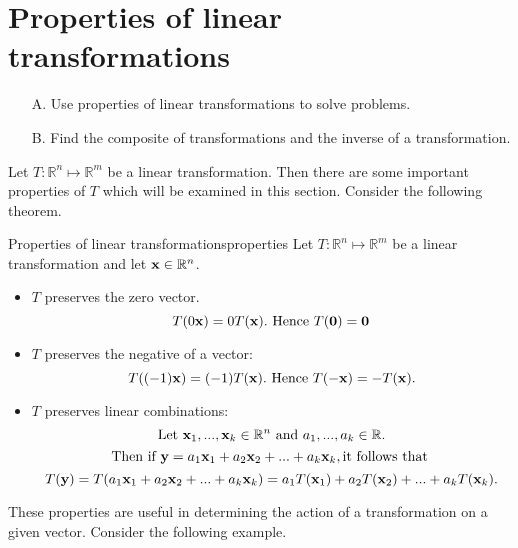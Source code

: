 \section{Properties of linear transformations}

\begin{outcome}
\begin{enumerate}
\item[A.] Use properties of linear transformations to solve problems. 

\item[B.] Find the composite of transformations and the inverse of a transformation.
\end{enumerate}
\end{outcome}

Let $T: \mathbb{R}^n \mapsto \mathbb{R}^m$ be a linear transformation. Then there are some important properties of $T$ which will be examined in this section. 
Consider the following theorem.

\begin{theorem}{Properties of linear transformations}{properties}
Let $T: \mathbb{R}^n \mapsto \mathbb{R}^m$ be a linear transformation and let ${\bf x} \in \mathbb{R}^n$. 

\begin{itemize}
\item $T$ preserves the zero vector. 
\[
T(0{\bf x}) = 0 T({\bf x}). \mbox{ Hence }T({\bf 0}) = {\bf 0}
\]
\item $T$ preserves the negative of a vector:
\[
T( (-1){\bf x})=(-1)T({\bf x}). \mbox{ Hence }T(-{\bf x}) = -T({\bf x}).
\]
\item $T$ preserves linear combinations:
\[
\mbox{Let }{\bf x}_1, ..., {\bf x}_k \in \mathbb{R}^n \mbox{ and }a_1, ..., a_k \in \mathbb{R}.
\]
\[
\mbox{Then if }{\bf y} = a_1{\bf x}_1 + a_2{\bf x}_2 + ...+a_k {\bf x}_k, \mbox{it follows that }
\]
\[
T({\bf y}) = T(a_1{\bf x}_1 + a_2{\bf x}_2 + ...+a_k {\bf x}_k) = a_1T({\bf x}_1) + a_2T({\bf x}_2) + ...+a_k T({\bf x}_k).
\] 
\end{itemize}
\end{theorem}

These properties are useful in determining the action of a transformation on a given vector. Consider the following example.

